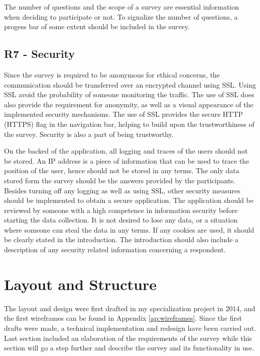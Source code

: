     The number of questions and the scope of a survey are essential information when deciding to participate or not. To signalize the number of questions, a progess bar of some extent should be included in the survey.

    \subsection*{R7 - Security}
    Since the survey is required to be anonymous for ethical concerns, the communication should be transferred over an encrypted channel using SSL. Using SSL avoid the probability of someone monitoring the traffic. The use of SSL does also provide the requirement for anonymity, as well as a visual appearance of the implemented security mechanisms. The use of SSL provides the secure HTTP (HTTPS) flag in the navigation bar, helping to build upon the trustworthiness of the survey. Security is also a part of being trustworthy. 

    On the backed of the application, all logging and traces of the users should not be stored. An IP address is a piece of information that can be used to trace the position of the user, hence should not be stored in any terms. The only data stored form the survey should be the answers provided by the participants. Besides turning off any logging as well as using SSL, other security measures should be implemented to obtain a secure application. The application should be reviewed by someone with a high competence in information security before starting the data collection. It is not desired to lose any data, or a situation where someone can steal the data in any terms. If any cookies are used, it should be clearly stated in the introduction. The introduction should also include a description of any security related information concerning a respondent.

	\section{Layout and Structure}\label{sec:layoutandstructure}
  The layout and design were first drafted in my specialization project in 2014, and the first wireframes can be found in Appendix \ref{ap:wireframes}. Since the first drafts were made, a technical implementation and redesign have been carried out. Last section included an elaboration of the requirements of the survey while this section will go a step further and describe the survey and its functionality in use. 

